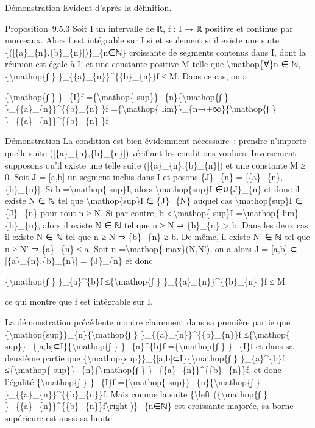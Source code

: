 \documentclass[]{article}
\begin{document}
Démonstration Evident d'après la définition.

Proposition~9.5.3 Soit I un intervalle de ℝ, f : I → ℝ positive et
continue par morceaux. Alors f est intégrable sur I si et seulement si
il existe une suite \{({[}\{a\}\_\{n\},\{b\}\_\{n\}{]})\}\_\{n∈ℕ\}
croissante de segments contenus dans I, dont la réunion est égale à I,
et une constante positive M telle que \textbackslash{}mathop\{∀\}n ∈ ℕ,
\{\textbackslash{}mathop\{∫ \} \}\_\{\{a\}\_\{n\}\}\^{}\{\{b\}\_\{n\}\}f
≤ M. Dans ce cas, on a

\{\textbackslash{}mathop\{∫ \} \}\_\{I\}f =\{\textbackslash{}mathop\{
sup\}\}\_\{n\}\{\textbackslash{}mathop\{∫ \}
\}\_\{\{a\}\_\{n\}\}\^{}\{\{b\}\_\{n\} \}f =\{\textbackslash{}mathop\{
lim\}\}\_\{n→+∞\}\{\textbackslash{}mathop\{∫ \}
\}\_\{\{a\}\_\{n\}\}\^{}\{\{b\}\_\{n\} \}f

Démonstration La condition est bien évidemment nécessaire~: prendre
n'importe quelle suite ({[}\{a\}\_\{n\},\{b\}\_\{n\}{]}) vérifiant les
conditions voulues. Inversement supposons qu'il existe une telle suite
({[}\{a\}\_\{n\},\{b\}\_\{n\}{]}) et une constante M ≥ 0. Soit J =
{[}a,b{]} un segment inclus dans I et posons \{J\}\_\{n\} =
{[}\{a\}\_\{n\},\{b\}\_\{n\}{]}. Si b =\textbackslash{}mathop\{ sup\}I,
alors \textbackslash{}mathop\{sup\}I ∈∪\{J\}\_\{n\} et donc il existe N
∈ ℕ tel que \textbackslash{}mathop\{sup\}I ∈ \{J\}\_\{N\} auquel cas
\textbackslash{}mathop\{sup\}I ∈ \{J\}\_\{n\} pour tout n ≥ N. Si par
contre, b \textless{}\textbackslash{}mathop\{ sup\}I
=\textbackslash{}mathop\{ lim\}\{b\}\_\{n\}, alors il existe N ∈ ℕ tel
que n ≥ N ⇒ \{b\}\_\{n\} \textgreater{} b. Dans les deux cas il existe N
∈ ℕ tel que n ≥ N ⇒ \{b\}\_\{n\} ≥ b. De même, il existe N' ∈ ℕ tel que
n ≥ N' ⇒ \{a\}\_\{n\} ≤ a. Soit n =\textbackslash{}mathop\{ max\}(N,N'),
on a alors J = {[}a,b{]} ⊂ {[}\{a\}\_\{n\},\{b\}\_\{n\}{]} =
\{J\}\_\{n\} et donc

\{\textbackslash{}mathop\{∫ \} \}\_\{a\}\^{}\{b\}f
≤\{\textbackslash{}mathop\{∫ \} \}\_\{\{a\}\_\{n\}\}\^{}\{\{b\}\_\{n\}
\}f ≤ M

ce qui montre que f est intégrable sur I.

La démonstration précédente montre clairement dans sa première partie
que \{\textbackslash{}mathop\{sup\}\}\_\{n\}\{\textbackslash{}mathop\{∫
\} \}\_\{\{a\}\_\{n\}\}\^{}\{\{b\}\_\{n\}\}f ≤\{\textbackslash{}mathop\{
sup\}\}\_\{{[}a,b{]}⊂I\}\{\textbackslash{}mathop\{∫ \}
\}\_\{a\}\^{}\{b\}f =\{\textbackslash{}mathop\{∫ \} \}\_\{I\}f et dans
sa deuxième partie que
\{\textbackslash{}mathop\{sup\}\}\_\{{[}a,b{]}⊂I\}\{\textbackslash{}mathop\{∫
\} \}\_\{a\}\^{}\{b\}f ≤\{\textbackslash{}mathop\{
sup\}\}\_\{n\}\{\textbackslash{}mathop\{∫ \}
\}\_\{\{a\}\_\{n\}\}\^{}\{\{b\}\_\{n\}\}f, et donc l'égalité
\{\textbackslash{}mathop\{∫ \} \}\_\{I\}f =\{\textbackslash{}mathop\{
sup\}\}\_\{n\}\{\textbackslash{}mathop\{∫ \}
\}\_\{\{a\}\_\{n\}\}\^{}\{\{b\}\_\{n\}\}f. Mais comme la suite
\{\textbackslash{}left (\{\textbackslash{}mathop\{∫ \}
\}\_\{\{a\}\_\{n\}\}\^{}\{\{b\}\_\{n\}\}f\textbackslash{}right
)\}\_\{n∈ℕ\} est croissante majorée, sa borne supérieure est aussi sa
limite.
\end{document}
